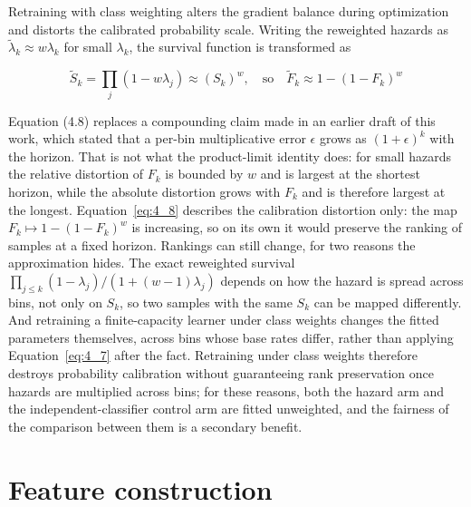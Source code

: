Retraining with class weighting alters the gradient balance during optimization and distorts the calibrated probability scale. Writing the reweighted hazards as $\tilde{\lambda}_k \approx w\lambda_k$ for small $\lambda_k$, the survival function is transformed as


\begin{equation}\label{eq:4_8} \tilde{S}_k = \prod_j (1 - w \lambda_j) \approx (S_k)^w, \quad \text{so} \quad \tilde{F}_k \approx 1 - (1 - F_k)^w \end{equation}

Equation (4.8) replaces a compounding claim made in an earlier draft of this work, which stated that a per-bin multiplicative error $\epsilon$ grows as $(1+\epsilon)^k$ with the horizon. That is not what the product-limit identity does: for small hazards the relative distortion of $F_k$ is bounded by $w$ and is largest at the shortest horizon, while the absolute distortion grows with $F_k$ and is therefore largest at the longest. Equation~\eqref{eq:4_8} describes the calibration distortion only: the map $F_k \mapsto 1 - (1 - F_k)^w$ is increasing, so on its own it would preserve the ranking of samples at a fixed horizon. Rankings can still change, for two reasons the approximation hides. The exact reweighted survival $\prod_{j \le k} (1 - \lambda_j)/(1 + (w-1)\lambda_j)$ depends on how the hazard is spread across bins, not only on $S_k$, so two samples with the same $S_k$ can be mapped differently. And retraining a finite-capacity learner under class weights changes the fitted parameters themselves, across bins whose base rates differ, rather than applying Equation~\eqref{eq:4_7} after the fact. Retraining under class weights therefore destroys probability calibration without guaranteeing rank preservation once hazards are multiplied across bins; for these reasons, both the hazard arm and the independent-classifier control arm are fitted unweighted, and the fairness of the comparison between them is a secondary benefit.


\section{Feature construction}
\label{sec:4_6}


